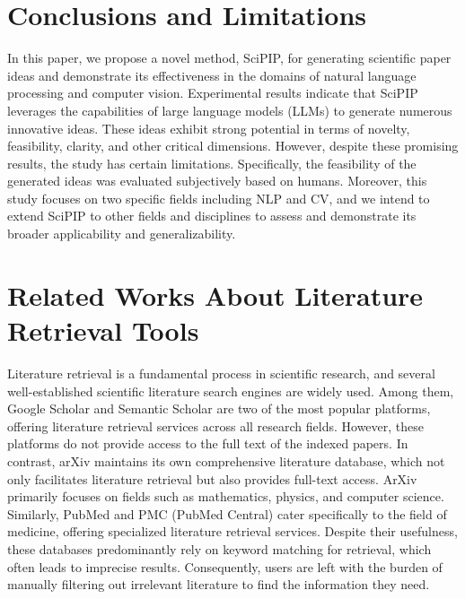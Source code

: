 \documentclass{article}
\theoremstyle{plain}
\theoremstyle{definition}
\theoremstyle{remark}
\begin{document}
\section{Conclusions and Limitations}
In this paper, we propose a novel method, SciPIP, for generating scientific paper ideas and demonstrate its effectiveness in the domains of natural language processing and computer vision. Experimental results indicate that SciPIP leverages the capabilities of large language models (LLMs) to generate numerous innovative ideas. These ideas exhibit strong potential in terms of novelty, feasibility, clarity, and other critical dimensions. However, despite these promising results, the study has certain limitations. Specifically, the feasibility of the generated ideas was evaluated subjectively based on humans. Moreover, this study focuses on two specific fields including NLP and CV, and we intend to extend SciPIP to other fields and disciplines to assess and demonstrate its broader applicability and generalizability.





\newpage
\appendix
\onecolumn
\section{Related Works About Literature Retrieval Tools} \label{sec:lrt}
Literature retrieval is a fundamental process in scientific research, and several well-established scientific literature search engines are widely used. Among them, Google Scholar and Semantic Scholar are two of the most popular platforms, offering literature retrieval services across all research fields. However, these platforms do not provide access to the full text of the indexed papers. In contrast, arXiv maintains its own comprehensive literature database, which not only facilitates literature retrieval but also provides full-text access. ArXiv primarily focuses on fields such as mathematics, physics, and computer science. Similarly, PubMed and PMC (PubMed Central) cater specifically to the field of medicine, offering specialized literature retrieval services. Despite their usefulness, these databases predominantly rely on keyword matching for retrieval, which often leads to imprecise results. Consequently, users are left with the burden of manually filtering out irrelevant literature to find the information they need.
\end{document}

